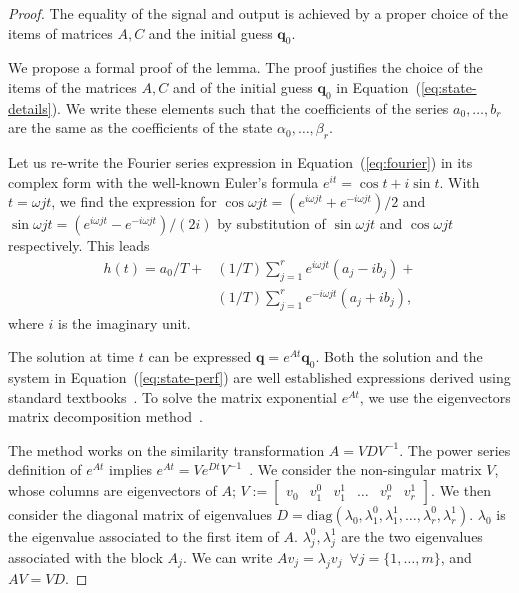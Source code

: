 \begin{proof}
The equality of the signal and output is achieved by a proper choice of the items of matrices $A,C$ and the initial guess $\mathbf{q}_0$. 

We propose a formal proof of the lemma. The proof justifies the choice of the items of the matrices $A,C$ and of the initial guess $\mathbf{q}_0$ in Equation~(\ref{eq:state-details}). We write these elements such that the coefficients of the series $a_0,\dots,b_r$ are the same as the coefficients of the state $\alpha_0,\dots,\beta_r$.

Let us re-write the Fourier series expression in Equation~(\ref{eq:fourier}) in its complex form with the well-known Euler's formula $e^{it}=\cos{t}+i\sin{t}$. With $t=\omega jt$, we find the expression for $\cos{\omega jt}=(e^{i\omega jt}+e^{-i\omega jt})/2$ and $\sin{\omega jt}=(e^{i\omega jt}-e^{-i\omega jt})/(2i)$ by substitution of $\sin{\omega jt}$ and $\cos{\omega jt}$ respectively. This leads~\cite{kuo1967automatic}
\begin{equation}\begin{split}\label{eq:proof-complex}
  h(t)=a_0/T+&(1/T)\sum_{j=1}^{r}{e^{i\omega jt}(a_j-ib_j)}+\\&(1/T)\sum_{j=1}^{r}{e^{-i\omega jt}(a_j+ib_j)},
 \end{split}\end{equation}
where $i$ is the imaginary unit. 

The solution at time $t$ can be expressed $\mathbf{q}=e^{At}\mathbf{q}_0$. Both the solution and the system in Equation~(\ref{eq:state-perf}) are well established expressions derived using standard textbooks~\cite{kuo1967automatic, ogata2002modern}. To solve the matrix exponential $e^{At}$, we use the eigenvectors matrix decomposition method~\cite{moler2003nineteen}.

The method works on the similarity transformation $A=VDV^{-1}$. The power series definition of $e^{At}$ implies $e^{At}=Ve^{Dt}V^{-1}$~\cite{moler2003nineteen}. We consider the non-singular matrix $V$, whose columns are eigenvectors of $A$; $V:=\begin{bmatrix}v_0 & v_1^0 & v_1^1 & \dots & v_r^0 & v_r^1\end{bmatrix}$. We then consider the diagonal matrix of eigenvalues $D=\mathrm{diag}{(\lambda_0,\lambda_1^0,\lambda_1^1,\dots,\lambda_r^0,\lambda_r^1)}$. $\lambda_0$ is the eigenvalue associated to the first item of $A$. $\lambda_j^0,\lambda_j^1$ are the two eigenvalues associated with the block $A_j$. We can write $Av_j=\lambda_jv_j\,\,\,\forall j=\{1,\dots,m\}$, and $AV=VD$. 


\end{proof}
